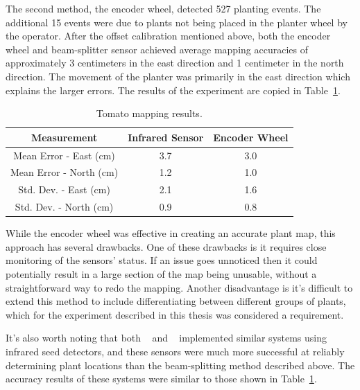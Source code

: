 The second method, the encoder wheel, detected 527 planting events.  The additional 15 events were due to plants not being placed in the planter wheel by the operator.  After the offset calibration mentioned above, both the encoder wheel and beam-splitter sensor achieved average mapping accuracies of approximately 3 centimeters in the east direction and 1 centimeter in the north direction.  The movement of the planter was primarily in the east direction which explains the larger errors.  The results of the experiment are copied in Table~\ref{table:tomato_results}.  

\begin{table}
    \begin{center}
    \caption[Tomato mapping results]{Tomato mapping results.}
    \begin{tabular}[c]{|c|c|c|}
        \hline
        Measurement & Infrared Sensor & Encoder Wheel \\
        \hline
        Mean Error - East (cm)   & 3.7       &  3.0    \\
        Mean Error - North (cm)  & 1.2       & 1.0     \\
        Std. Dev. - East (cm)    & 2.1       & 1.6     \\
        Std. Dev. - North (cm)   & 0.9       & 0.8     \\
        \hline
    \end{tabular}
    \label{table:tomato_results}
   \end{center}
\end{table} 
          
While the encoder wheel was effective in creating an accurate plant map, this approach has several drawbacks. One of these drawbacks is it requires close monitoring of the sensors' status. If an issue goes unnoticed then it could potentially result in a large section of the map being unusable, without a straightforward way to redo the mapping. Another disadvantage is it's difficult to extend this method to include differentiating between different groups of plants, which for the experiment described in this thesis was considered a requirement.
          
It's also worth noting that both ~\citep{Nørremark:2007} and ~\citep{Ehsani:2004} implemented similar systems using infrared seed detectors, and these sensors were much more successful at reliably determining plant locations than the beam-splitting method described above.  The accuracy results of these systems were similar to those shown in Table~\ref{table:tomato_results}.
          
